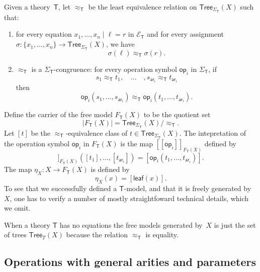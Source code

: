 \documentclass{amsart}
\newcommand{\theory}[1]{\mathsf{#1}} %
\newcommand{\signature}[1]{\Sigma_{\theory{#1}}} %
\newcommand{\equations}[1]{\mathcal{E}_{\theory{#1}}} %
\newcommand{\Free}[2]{F_{\theory{#1}}(#2)} %
\newcommand{\set}[1]{\{#1\}} %
\newcommand{\Tree}[2]{\mathsf{Tree}_{#1}(#2)} %
\newcommand{\leaf}[1]{\mathsf{leaf}(#1)} %
\newcommand{\op}[1]{\mathsf{op}_{#1}} %
\newcommand{\arity}[1]{\mathsf{ar}_{#1}} %
\newcommand{\sem}[1]{[\![#1]\!]} %
\begin{document}
Given a theory~$\theory{T}$, let $\approx_\theory{T}$ be the least equivalence relation on
$\Tree{\signature{T}}{X}$ such that:
%
\begin{enumerate}
\item for every equation $x_1, \ldots, x_n \mid \ell = r$ in $\equations{T}$ and for every
  assignment $\sigma : \set{x_1, \ldots, x_n} \to \Tree{\signature{T}}{X}$, we have
  \begin{equation*}
    \sigma(\ell) \approx_{\theory{T}} \sigma(r).
  \end{equation*}
\item $\approx_{\theory{T}}$ is a $\signature{T}$-congruence: for every operation symbol
  $\op{i}$ in $\signature{T}$, if
  \begin{equation*}
    s_1 \approx_{\theory{T}} t_1,
    \quad \ldots \quad,
    s_{\arity{i}} \approx_{\theory{T}} t_{\arity{i}}
  \end{equation*}
  then
  \begin{equation*}
    \op{i}(s_1, \ldots, s_{\arity{i}}) \approx_{\theory{T}}
    \op{i}(t_1, \ldots, t_{\arity{i}}).
  \end{equation*}
\end{enumerate}
%
Define the carrier of the free model $\Free{T}{X}$ to be the quotient set
%
\begin{equation*}
  |\Free{T}{X}| = \Tree{\signature{T}}{X} / {\approx_{\theory{T}}}.
\end{equation*}
%
Let $[t]$ be the $\approx_{\theory{T}}$-equivalence class of
$t \in \Tree{\signature{T}}{X}$. The intepretation of the operation symbol $\op{i}$ in
  $\Free{T}{X}$ is the map $\sem{\op{i}}_{\Free{T}{X}}$ defined by
%
\begin{equation*}
  \sem{\op{i}}_{\Free{T}{X}}([t_1], \ldots, [t_{\arity{i}}]) =
  [\op{i}(t_1, \ldots, t_{\arity{i}})].
\end{equation*}
%
The map $\eta_X : X \to \Free{T}{X}$ is defined by
%
\begin{equation*}
  \eta_X(x) = [\leaf{x}].
\end{equation*}
%
To see that we successfully defined a $\theory{T}$-model, and that it is freely generated
by~$X$, one has to verify a number of mostly straightfoward technical details, which we
omit.

When a theory $\theory{T}$ has no equations the free models generated by~$X$ is just the
set of trees $\Tree{T}{X}$ because the relation $\approx_{\theory{T}}$ is equality.

\subsection{Operations with general arities and parameters}
\label{sec:oper-gener-arit-param}
\end{document}

